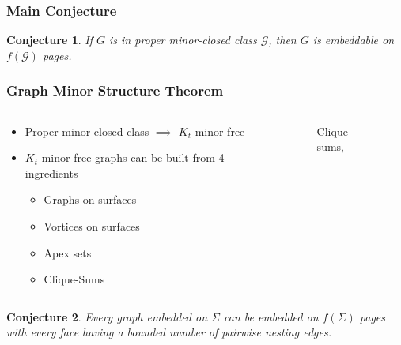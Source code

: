 \documentclass[english]{beamer}
\newtheorem{conjecture}{Conjecture}
\begin{document}
\begin{frame}
  \frametitle{Main Conjecture}
  \begin{conjecture}
    If $G$ is in proper minor-closed class $\mathcal{G}$, then $G$ is embeddable on $f(\mathcal{G})$ pages.
  \end{conjecture}
\end{frame}

\begin{frame}
  \frametitle{Graph Minor Structure Theorem}
  \begin{columns}
    \begin{column}{0.5\textwidth}
      \begin{itemize}
        \item Proper minor-closed class $\implies$ $K_t$-minor-free
        \item $K_t$-minor-free graphs can be built from 4 ingredients \cite{robertsonGraphMinorsXVII1999} \begin{itemize}
                \item Graphs on surfaces
                \item Vortices on surfaces
                \item Apex sets
                \item Clique-Sums
              \end{itemize}
      \end{itemize}
    \end{column}
    \begin{column}{0.5\textwidth}
      \begin{figure}
        \centering
        
        \caption{Clique sums, \cite{eppsteinCliquesum2023}}
      \end{figure}
    \end{column}
  \end{columns}
\end{frame}

\begin{frame}
  \begin{conjecture}
    Every graph embedded on $\Sigma$ can be embedded on $f(\Sigma)$ pages with every face having a bounded number of pairwise nesting edges.
  \end{conjecture}
\end{frame}

\begin{frame}[shrink = 50]

  \printbibliography
\end{frame}
\end{document}
